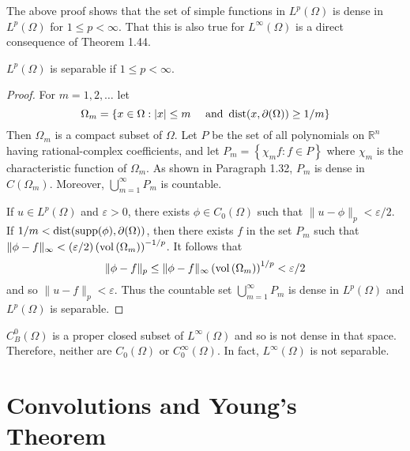 \begin{para}
  The above proof shows that the set of simple functions in $L^p(\Omega)$ is dense in $L^p(\Omega)$ for $1 \leq p<\infty$. That this is also true for $L^{\infty}(\Omega)$ is a direct consequence of Theorem 1.44.
\end{para}


\begin{theorem}
  $L^p(\Omega)$ is separable if $1 \leq p<\infty$.
\end{theorem}

\begin{proof}
  For $m=1,2, \ldots$ let
  \[
  \Omega_m=\{x \in \Omega:|x| \leq m \quad \text { and } \operatorname{dist}(x, \partial(\Omega)) \geq 1 / m\}
  \]
  Then $\Omega_m$ is a compact subset of $\Omega$. Let $P$ be the set of all polynomials on $\mathbb{R}^n$ having rational-complex coefficients, and let $P_m=\left\{\chi_m f: f \in P\right\}$ where $\chi_m$ is the characteristic function of $\Omega_m$. As shown in Paragraph 1.32, $P_m$ is dense in $C\left(\Omega_m\right)$. Moreover, $\bigcup_{m=1}^{\infty} P_m$ is countable.
  
  If $u \in L^p(\Omega)$ and $\varepsilon>0$, there exists $\phi \in C_0(\Omega)$ such that $\|u-\phi\|_p<\varepsilon / 2$. If $1 / m<\operatorname{dist}(\operatorname{supp}(\phi), \partial(\Omega))$, then there exists $f$ in the set $P_m$ such that $\|\phi-f\|_{\infty}<(\varepsilon / 2)\left(\operatorname{vol}\left(\Omega_m\right)\right)^{-1 / p}$. It follows that
  \[
  \|\phi-f\|_p \leq\|\phi-f\|_{\infty}\left(\operatorname{vol}\left(\Omega_m\right)\right)^{1 / p}<\varepsilon / 2
  \]
  and so $\|u-f\|_p<\varepsilon$. Thus the countable set $\bigcup_{m=1}^{\infty} P_m$ is dense in $L^p(\Omega)$ and $L^p(\Omega)$ is separable.
\end{proof}

\begin{para}
  $C_B^0(\Omega)$ is a proper closed subset of $L^{\infty}(\Omega)$ and so is not dense in that space. Therefore, neither are $C_0(\Omega)$ or $C_0^{\infty}(\Omega)$. In fact, $L^{\infty}(\Omega)$ is not separable.
\end{para}


\section{Convolutions and Young's Theorem}


